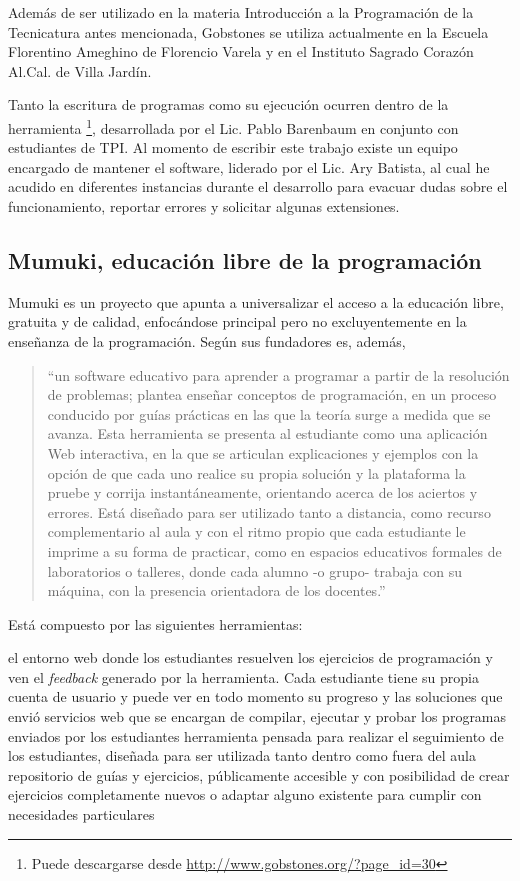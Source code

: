 Además de ser utilizado en la materia Introducción a la Programación de la Tecnicatura antes mencionada, Gobstones se utiliza actualmente en la Escuela Florentino Ameghino de Florencio Varela y en el Instituto Sagrado Corazón Al.Cal. de Villa Jardín.

Tanto la escritura de programas como su ejecución ocurren dentro de la herramienta \pyGob \footnote{Puede descargarse desde \url{http://www.gobstones.org/?page_id=30}}, desarrollada por el Lic. Pablo Barenbaum en conjunto con estudiantes de TPI. Al momento de escribir este trabajo existe un equipo encargado de mantener el software, liderado por el Lic. Ary Batista, al cual he acudido en diferentes instancias durante el desarrollo para evacuar dudas sobre el funcionamiento, reportar errores y solicitar algunas extensiones.

\subsection{Mumuki, educación libre de la programación}
Mumuki es un proyecto que apunta a universalizar el acceso a la educación libre, gratuita y de calidad, enfocándose principal pero no excluyentemente en la enseñanza de la programación. Según sus fundadores es, además,

\begin{quote}
``un software educativo para aprender a programar a partir de la resolución de problemas; plantea enseñar conceptos de programación, en un proceso conducido por guías prácticas en las que la teoría surge a medida que se avanza. Esta herramienta se presenta al estudiante como una aplicación Web interactiva, en la que se articulan explicaciones y ejemplos con la opción de que cada uno realice su propia solución y la plataforma la pruebe y corrija instantáneamente, orientando acerca de los aciertos y errores. Está diseñado para ser utilizado tanto a distancia, como recurso complementario al aula y con el ritmo propio que cada estudiante le imprime a su forma de practicar, como en espacios educativos formales de laboratorios o talleres, donde cada alumno -o grupo- trabaja con su máquina, con la presencia orientadora de los docentes.''\cite{PaperMumuki}
\end{quote}

Está compuesto por las siguientes herramientas:
\begin{itemize}
   el entorno web donde los estudiantes resuelven los ejercicios de programación y ven el \textit{feedback} generado por la herramienta. Cada estudiante tiene su propia cuenta de usuario y puede ver en todo momento su progreso y las soluciones que envió
   servicios web que se encargan de compilar, ejecutar y probar los programas enviados por los estudiantes
   herramienta pensada para realizar el seguimiento de los estudiantes, diseñada para ser utilizada tanto dentro como fuera del aula
   repositorio de guías y ejercicios, públicamente accesible y con posibilidad de crear ejercicios completamente nuevos o adaptar alguno existente para cumplir con necesidades particulares
\end{itemize}

